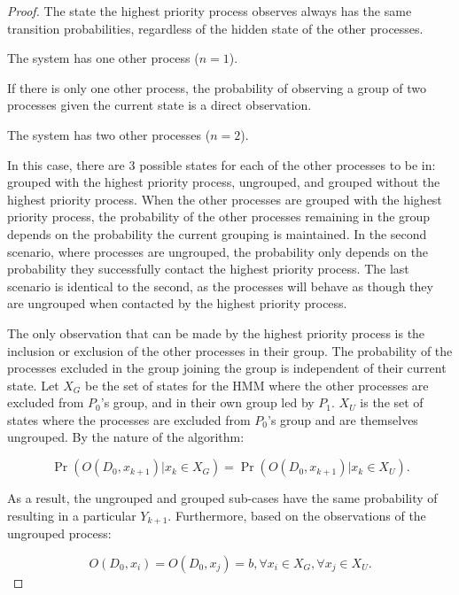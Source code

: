 \begin{proof}
    The state the highest priority process observes always has the same transition probabilities, regardless of the hidden state of the other processes.
\begin{case}
    The system has one other process ($n=1$).
\end{case}

If there is only one other process, the probability of observing a group of two processes given the current state is a direct observation.

\begin{case}
    The system has two other processes ($n=2$).
\end{case}

In this case, there are 3 possible states for each of the other processes to be in: grouped with the highest priority process, ungrouped, and grouped without the highest priority process.
When the other processes are grouped with the highest priority process, the probability of the other processes remaining in the group depends on the probability the current grouping is maintained.
In the second scenario, where processes are ungrouped, the probability only depends on the probability they successfully contact the highest priority process.
The last scenario is identical to the second, as the processes will behave as though they are ungrouped when contacted by the highest priority process.

The only observation that can be made by the highest priority process is the inclusion or exclusion of the other processes in their group.
The probability of the processes excluded in the group joining the group is independent of their current state.
Let $X_G$ be the set of states for the \ac{HMM} where the other processes are excluded from $P_0$'s group, and in their own group led by $P_1$.
$X_U$ is the set of states where the processes are excluded from $P_0$'s group and are themselves ungrouped.
By the nature of the algorithm: 

\begin{equation}
\Pr(O(D_0, x_{k+1}) | x_k \in X_G) = \Pr(O(D_0, x_{k+1}) | x_k \in X_U).
\label{eq:sameprob}
\end{equation}

As a result, the ungrouped and grouped sub-cases have the same probability of resulting in a particular $Y_{k+1}$.
Furthermore, based on the observations of the ungrouped process:

\begin{equation}
O(D_0, x_i) = O(D_0, x_j) = b, \forall x_i \in X_G, \forall x_j \in X_U.
\end{equation}


\end{proof}
